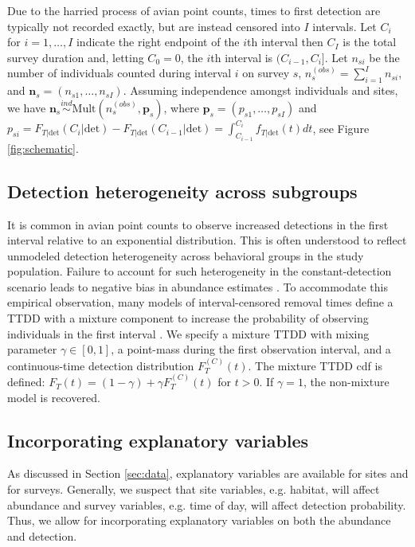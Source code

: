 \documentclass[12pt]{article}
\newcommand{\vn}{\textbf{n}}
\newcommand{\vp}{\textbf{p}}
\newcommand{\Mult}{\mbox{Mult}}
\newcommand{\ind}{\stackrel{ind}{\sim}}
\newcommand{\Fm}{F_T^{(C)}}
\newcommand{\dt}{\text{det}}
\newcommand{\nobs}{n^{(obs)}}
\begin{document}
Due to the harried process of avian point counts, times to first detection are typically not recorded exactly, but are instead censored into $I$ intervals. 
Let $C_i$ for $i=1,\dots,I$ indicate the right endpoint of the $i$th interval then $C_I$ is the total survey duration and, letting $C_0=0$, the $i$th interval is $(C_{i-1},C_{i}]$. 
Let $n_{si}$ be the number of individuals counted during interval $i$ on survey $s$, $\nobs_s = \sum_{i=1}^I n_{si}$, and $\vn_{s}=(n_{s1},\dots,n_{sI})$.
Assuming independence amongst individuals and sites, we have $\vn_{s} \ind \Mult \left(\nobs_s, \vp_{s}\right)$, where $\vp_{s}=(p_{s1},\dots,p_{sI})$ and $p_{si} = F_{T|\dt}(C_i|\dt) - F_{T|\dt}(C_{i-1}|\dt) = \int_{C_{i-1}}^{C_i} f_{T|\dt}(t) dt$, 
see Figure \ref{fig:schematic}.  

\subsection{Detection heterogeneity across subgroups} \label{s:subgroups}

It is common in avian point counts to observe increased detections in the first interval relative to an exponential distribution.
This is often understood to reflect unmodeled detection heterogeneity across behavioral groups in the study population.
Failure to account for such heterogeneity in the constant-detection scenario leads to negative bias in abundance estimates \citep{Otis1978}.
To accommodate this empirical observation, many models of interval-censored removal times define a TTDD with a mixture component to increase the probability of observing individuals in the first interval \citep{Farnsworth2002, Royle2004Generalized, Farnsworth2005, Alldredge2007, Etterson2009, Reidy2011}.
We specify a mixture TTDD with mixing parameter $\gamma\in[0,1]$, a point-mass during the first observation interval, and a continuous-time detection distribution $\Fm(t)$.
The mixture TTDD cdf is defined: $F_T(t) = (1-\gamma) + \gamma \Fm(t)$ for $t>0$.
If $\gamma=1$, the non-mixture model is recovered.


\subsection{Incorporating explanatory variables}\label{sec:covariates}

As discussed in Section \ref{sec:data}, explanatory variables are available for sites and for surveys. 
Generally, we suspect that site variables, e.g. habitat, will affect abundance and survey variables, e.g. time of day, will affect detection probability. 
Thus, we allow for incorporating explanatory variables on both the abundance and detection.
\end{document}
